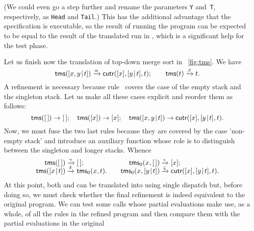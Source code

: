 (We could even go a step further and rename the \Erlang parameters
\texttt{Y} and~\texttt{T}, respectively, as \texttt{Head} and
\texttt{Tail}.) This has the additional advantage that the
specification is executable, so the result of running the \Erlang
program can be expected to be equal to the result of the translated
run in \Java, which is a significant help for the test phase.

Let us finish now the translation of top\hyp{}down merge sort in
\fig~\vref{fig:tms}. We have
\begin{equation*}
\textsf{tms}([{x,y}\!\mid\!{t}]) \xrightarrow{\smash{\alpha}}
 \textsf{cutr}([x],[{y}\!\mid\!{t}],t);\qquad
\textsf{tms}(t) \xrightarrow{\smash{\beta}} t.
\end{equation*}
A refinement is necessary because rule~\clause{\beta} covers the case
of the empty stack and the singleton stack. Let us make all these
cases explicit and reorder them as follows:
\begin{equation*}
\textsf{tms}([\,])            \rightarrow  [\,];\quad
\textsf{tms}([x])            \rightarrow  [x];\quad
\textsf{tms}([{x,y}\!\mid\!{t}])  \rightarrow
                          \textsf{cutr}([x],[{y}\!\mid\!{t}],t).
\end{equation*}
Now, we must fuse the two last rules because they are covered by the
case 'non\hyp{}empty stack' and introduce an auxiliary function
 whose role is to distinguish between the singleton
and longer stacks. Whence
\begin{equation*}
\begin{array}{@{}r@{\;}l@{\;}l@{\qquad}r@{\;}l@{\;}l@{}}
  \fun{tms}(\el)             & \xrightarrow{\smash{\gamma}} & \el;
& \fun{tms}_0(x,\el)         & \xrightarrow{\smash{\epsilon}} & [x];\\
\fun{tms}(\cons{x}{t})       & \xrightarrow{\smash{\delta}}
                             & \fun{tms}_0(x,t).
& \fun{tms}_0(x,\cons{y}{t}) & \xrightarrow{\smash{\zeta}}
                             & \fun{cutr}([x],\cons{y}{t},t).
\end{array}
\end{equation*}
At this point, both  and  can be
translated into \Java using single dispatch but, before doing so, we
must check whether the final refinement is indeed equivalent to the
original program. We can test some calls whose partial
evaluations make
use, as a whole, of all the rules in the refined program and then
compare them with the partial evaluations in the original
